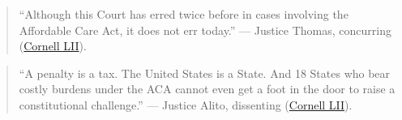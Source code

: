 \documentclass[12pt]{article}
\begin{document}
\begin{quote}
``Although this Court has erred twice before in cases involving the Affordable Care Act, it does not err today.'' --- Justice Thomas, concurring (\href{https://www.law.cornell.edu/supremecourt/text/19-840}{Cornell LII}).
\end{quote}

\begin{quote}
``A penalty is a tax. The United States is a State. And 18 States who bear costly burdens under the ACA cannot even get a foot in the door to raise a constitutional challenge.'' --- Justice Alito, dissenting (\href{https://www.law.cornell.edu/supremecourt/text/19-840}{Cornell LII}).
\end{quote}
\end{document}
